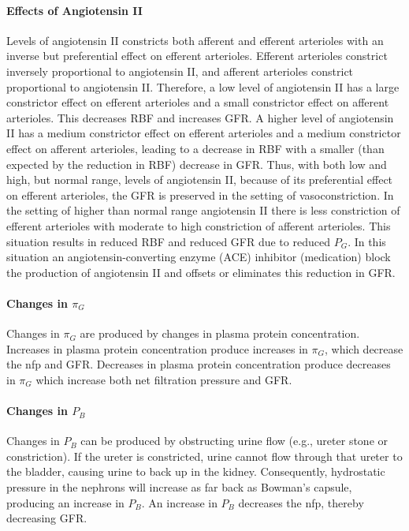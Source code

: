 \paragraph{Effects of Angiotensin II}

Levels of angiotensin II constricts both afferent and efferent arterioles with an inverse but preferential effect on efferent arterioles. Efferent arterioles constrict inversely proportional to angiotensin II, and afferent arterioles constrict proportional to angiotensin II. Therefore, a low level of angiotensin II has a large constrictor effect on efferent arterioles and a small constrictor effect on afferent arterioles. This decreases RBF and increases GFR. A higher level of angiotensin II has a medium constrictor effect on efferent arterioles and a medium constrictor effect on afferent arterioles, leading to a decrease in RBF with a smaller (than expected by the reduction in RBF) decrease in GFR. Thus, with both low and high, but normal range, levels of angiotensin II, because of its preferential effect on efferent arterioles, the GFR is preserved in the setting of vasoconstriction. In the setting of higher than normal range angiotensin II there is less constriction of efferent arterioles with moderate to high constriction of afferent arterioles. This situation results in reduced RBF and reduced GFR due to reduced  $P_{G}$. In this situation an angiotensin-converting enzyme (ACE) inhibitor (medication) block the production of angiotensin II and offsets or eliminates this reduction in GFR.

\paragraph{Changes in $\pi_{G}$}

Changes in $\pi_{G}$ are produced by changes in plasma protein concentration. Increases in plasma protein concentration produce increases in $\pi_{G}$, which decrease the nfp and GFR. Decreases in plasma protein concentration produce decreases in $\pi_{G}$ which increase both net filtration pressure and GFR.

\paragraph{Changes in $P_{B}$}

Changes in $P_{B}$ can be produced by obstructing urine flow (e.g., ureter stone or constriction). If the ureter is constricted, urine cannot flow through that ureter to the bladder, causing urine to back up in the kidney. Consequently, hydrostatic pressure in the nephrons will increase as far back as Bowman’s capsule, producing an increase in $P_{B}$. An increase in $P_{B}$ decreases the nfp, thereby decreasing GFR. 


